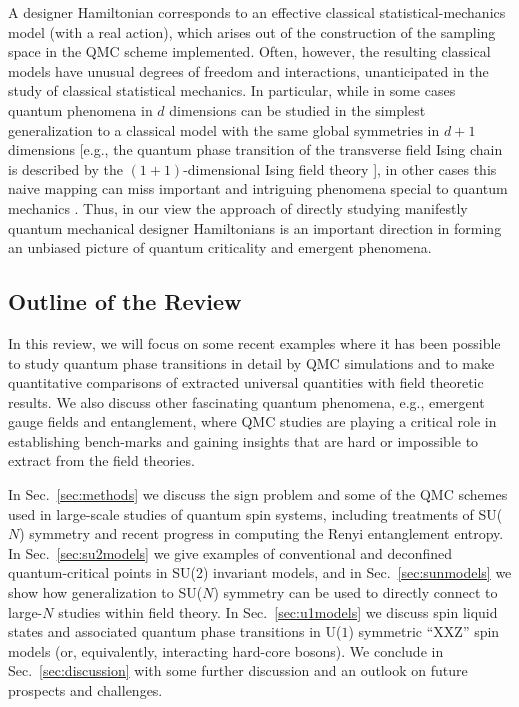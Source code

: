 \documentclass[range]{ar2e}
\begin{document}
A designer Hamiltonian corresponds to an effective classical statistical-mechanics model (with a real action), which arises out of the construction of the sampling 
space in the QMC scheme implemented. Often, however, the resulting classical models have unusual degrees of freedom and interactions, unanticipated in the study 
of classical statistical mechanics. In particular, while in some cases quantum phenomena in $d$ dimensions can be studied in the simplest generalization to a 
classical model with the same global symmetries in $d+1$ dimensions \cite{Rieger94,Sorensen92,Nahum11} [e.g., the quantum phase transition of the transverse field 
Ising chain is described by the $(1+1)$-dimensional Ising field theory \cite{Sachdev11}], in other cases this naive mapping can miss important and intriguing 
phenomena special to quantum mechanics \cite{Senthil04a,Fradkin04,Sachdev08}. Thus, in our view the approach of directly studying manifestly quantum mechanical 
designer Hamiltonians is an important direction in forming an unbiased picture of quantum criticality and emergent phenomena.

\subsection{Outline of the Review}

In this review, we will focus on some recent examples where it has been possible to study quantum phase transitions in detail 
by QMC simulations and to make quantitative comparisons of extracted universal quantities with field theoretic results. We also discuss other fascinating quantum phenomena, e.g., emergent gauge fields and entanglement, where QMC studies are
playing a critical role in establishing bench-marks and gaining insights that are hard or impossible to extract from the field theories.

In Sec.~\ref{sec:methods} we discuss the sign problem and some of the QMC schemes used in large-scale studies of quantum spin systems, 
including treatments of SU($N$) symmetry and recent progress in computing the Renyi entanglement entropy. In Sec.~\ref{sec:su2models} 
we give examples of conventional and deconfined quantum-critical points in SU(2) invariant models, and in Sec.~\ref{sec:sunmodels} 
we show how generalization to SU($N$) symmetry can be used to directly connect to large-$N$ studies within field theory. In Sec.~\ref{sec:u1models} 
we discuss spin liquid states and associated quantum phase transitions in U($1$) symmetric ``XXZ'' spin models (or, equivalently, interacting hard-core 
bosons). We conclude in Sec.~\ref{sec:discussion} with some further discussion and an outlook on future prospects and challenges.
\end{document}
